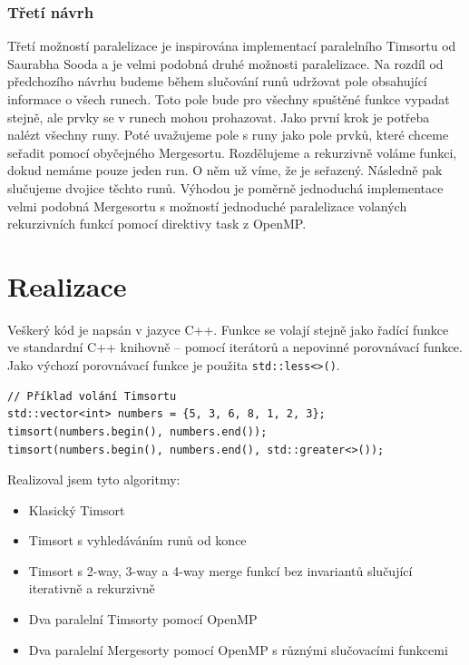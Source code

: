\documentclass[thesis=B,czech]{FITthesis}[2019/12/23]
\begin{document}
\subsection{Třetí návrh}
Třetí možností paralelizace je inspirována implementací paralelního Timsortu od Saurabha Sooda\cite{soodparallel} a je velmi podobná druhé možnosti paralelizace. Na rozdíl od předchozího návrhu budeme během slučování runů udržovat pole obsahující informace o všech runech. Toto pole bude pro všechny spuštěné funkce vypadat stejně, ale prvky se v runech mohou prohazovat. Jako první krok je potřeba nalézt všechny runy. Poté uvažujeme pole s runy jako pole prvků, které chceme seřadit pomocí obyčejného Mergesortu. Rozdělujeme a rekurzivně voláme funkci, dokud nemáme pouze jeden run. O něm už víme, že je seřazený. Následně pak slučujeme dvojice těchto runů. Výhodou je poměrně jednoduchá implementace velmi podobná Mergesortu s možností jednoduché paralelizace volaných rekurzivních funkcí pomocí direktivy task z OpenMP.



\chapter{Realizace}
Veškerý kód je napsán v jazyce C++. Funkce se volají stejně jako řadící funkce ve standardní C++ knihovně -- pomocí iterátorů a nepovinné porovnávací funkce. Jako výchozí porovnávací funkce je použita \texttt{std::less<>()}. 



\begin{verbatim}
// Příklad volání Timsortu
std::vector<int> numbers = {5, 3, 6, 8, 1, 2, 3};
timsort(numbers.begin(), numbers.end());
timsort(numbers.begin(), numbers.end(), std::greater<>());
\end{verbatim}


Realizoval jsem tyto algoritmy:
\begin{itemize}
	\item Klasický Timsort
	\item Timsort s vyhledáváním runů od konce
	\item Timsort s 2-way, 3-way a 4-way merge funkcí bez invariantů slučující iterativně a rekurzivně
	\item Dva paralelní Timsorty pomocí OpenMP 
	\item Dva paralelní Mergesorty pomocí OpenMP s různými slučovacími funkcemi
\end{itemize}
\end{document}
